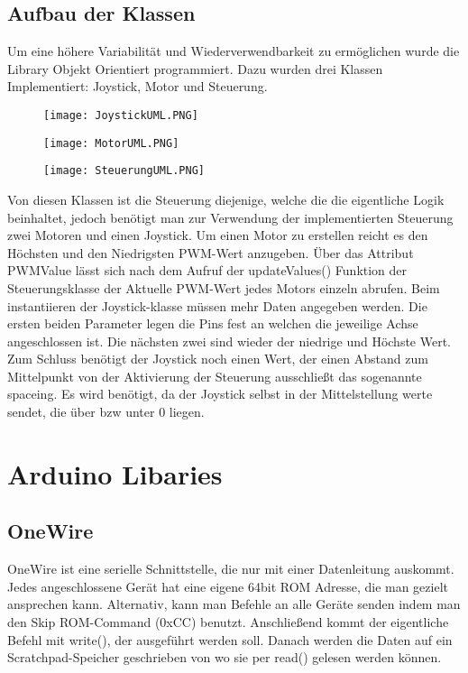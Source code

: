 \documentclass[12pt]{article}
\begin{document}
\subsection{Aufbau der Klassen}
Um eine höhere Variabilität und Wiederverwendbarkeit zu ermöglichen wurde die Library Objekt Orientiert programmiert. Dazu wurden drei Klassen Implementiert: Joystick, Motor und Steuerung.
\begin{figure}[h]
	\texttt{[image: JoystickUML.PNG]}
	\centering
\end{figure}\begin{figure}[h]
	\texttt{[image: MotorUML.PNG]}
	\centering
\end{figure}\begin{figure}[h]
	\texttt{[image: SteuerungUML.PNG]}
	\centering
\end{figure}
Von diesen Klassen ist die Steuerung diejenige, welche die die eigentliche Logik beinhaltet, jedoch benötigt man zur Verwendung der implementierten Steuerung zwei Motoren und einen Joystick. Um einen Motor zu erstellen reicht es den Höchsten und den Niedrigsten PWM-Wert anzugeben. Über das Attribut PWMValue lässt sich nach dem Aufruf der updateValues() Funktion der Steuerungsklasse der Aktuelle PWM-Wert jedes Motors einzeln abrufen. Beim instantiieren der Joystick-klasse müssen mehr Daten angegeben werden. Die ersten beiden Parameter legen die Pins fest an welchen die jeweilige Achse angeschlossen ist. Die nächsten zwei sind wieder der niedrige und Höchste Wert. Zum Schluss benötigt der Joystick noch einen Wert, der einen Abstand zum Mittelpunkt von der Aktivierung der Steuerung ausschließt das sogenannte spaceing. Es wird benötigt, da der Joystick selbst in der Mittelstellung werte sendet, die über bzw unter 0 liegen.   
 

\newpage
\section{Arduino Libaries} %
\subsection{OneWire}
OneWire ist eine serielle Schnittstelle, die nur mit einer Datenleitung auskommt. Jedes angeschlossene Gerät hat eine eigene 64bit ROM Adresse, die man gezielt ansprechen kann. Alternativ, kann man Befehle an alle Geräte senden indem man den Skip ROM-Command (0xCC) benutzt. Anschließend kommt der eigentliche Befehl mit write(), der ausgeführt werden soll. Danach werden die Daten auf ein Scratchpad-Speicher geschrieben von wo sie per read() gelesen werden können. 
\end{document}
